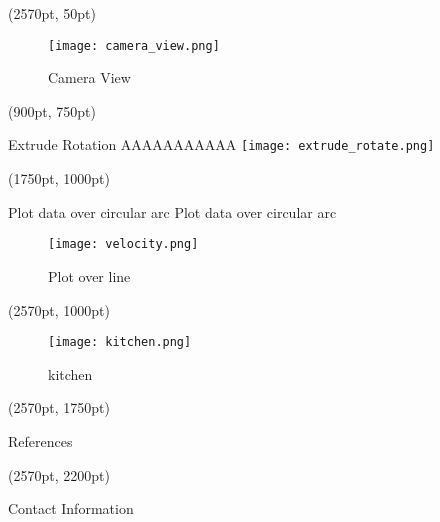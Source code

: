 \documentclass[final]{beamer}
\begin{document}
\begin{textblock*}{800pt}(2570pt, 50pt)
\begin{figure}
\texttt{[image: camera\_view.png]}
\caption{Camera View}
\end{figure}
\end{textblock*}

\begin{textblock*}{800pt}(900pt, 750pt)
\begin{block}{Extrude Rotation}
AAAAAAAAAAA
\texttt{[image: extrude\_rotate.png]}
\end{block}
\end{textblock*}

\begin{textblock*}{800pt}(1750pt, 1000pt)
\begin{block}{Plot data over circular arc}
Plot data over circular arc
\begin{figure}
\texttt{[image: velocity.png]}
\caption{Plot over line}
\end{figure}
\end{block}
\end{textblock*}

\begin{textblock*}{800pt}(2570pt, 1000pt)
\begin{figure}
\texttt{[image: kitchen.png]}
\caption{kitchen}
\end{figure}
\end{textblock*}

\begin{textblock*}{800pt}(2570pt, 1750pt)
\begin{block}{References}
\end{block}
\end{textblock*}

\begin{textblock*}{800pt}(2570pt, 2200pt)
\begin{block}{Contact Information}
\end{block}
\end{textblock*}
\end{document}
